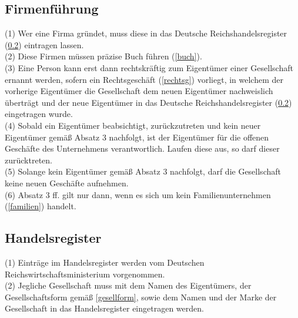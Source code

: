 \documentclass{article}
\begin{document}
\subsection{Firmenführung} \label{firm}
(1) Wer eine Firma gründet, muss diese in das Deutsche Reichshandelsregister (\ref{register}) eintragen lassen.\\
(2) Diese Firmen müssen präzise Buch führen (\ref{buch}).\\
(3) Eine Person kann erst dann rechtskräftig zum Eigentümer einer Gesellschaft ernannt werden, sofern ein Rechtsgeschäft (\ref{rechtsg}) vorliegt, in welchem der vorherige Eigentümer die Gesellschaft dem neuen Eigentümer nachweislich überträgt und der neue Eigentümer in das Deutsche Reichshandelsregister (\ref{register}) eingetragen wurde.\\
(4) Sobald ein Eigentümer beabsichtigt, zurückzutreten und kein neuer Eigentümer gemäß Absatz 3 nachfolgt, ist der Eigentümer für die offenen Geschäfte des Unternehmens verantwortlich. Laufen diese aus, so darf dieser zurücktreten.\\
(5) Solange kein Eigentümer gemäß Absatz 3 nachfolgt, darf die Gesellschaft keine neuen Geschäfte aufnehmen.\\
(6) Absatz 3 ff. gilt nur dann, wenn es sich um kein Familienunternehmen (\ref{familien}) handelt.

\subsection{Handelsregister} \label{register}
(1) Einträge im Handelsregister werden vom Deutschen Reichswirtschaftsministerium vorgenommen.\\
(2) Jegliche Gesellschaft muss mit dem Namen des Eigentümers, der Gesellschaftsform gemäß \ref{gesellform}, sowie dem Namen und der Marke der Gesellschaft in das Handelsregister eingetragen werden.
\end{document}

